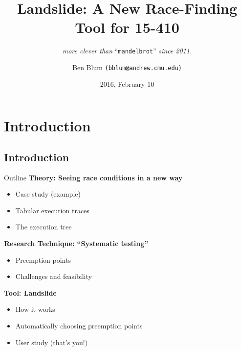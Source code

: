 \documentclass[xcolor=dvipsnames]{beamer}
\title[Landslide]{{\bf Landslide: A New Race-Finding Tool for 15-410}}
\subtitle[]{ {\em more clever than } ``\texttt{mandelbrot}'' {\em since 2011.}}
\author[Ben Blum]{Ben Blum \texttt{(bblum@andrew.cmu.edu)}}
\institute[CMU 15-410]{Carnegie Mellon University - 15-410}
\date[]{2016, February 10}
\begin{document}
\renewcommand{\inserttotalframenumber}{39}
\normalem
\begin{frame}
	\titlepage
\end{frame}


\newcommand\linegap{\vspace{0.2in}}
\newcommand\breakslide[1]{\begin{frame}{} \begin{center} #1 \end{center} \end{frame}}

\section{Introduction}
\subsection{Introduction}

\begin{frame}{Outline}
	\textbf{Theory: Seeing race conditions in a new way}
	\begin{itemize}
		\item Case study (example)
		\item Tabular execution traces
		\item The execution tree
	\end{itemize}
	{\bf Research Technique: ``Systematic testing''}
	\begin{itemize}
		\item Preemption points
		\item Challenges and feasibility
	\end{itemize}
	{\bf Tool: Landslide}
	\begin{itemize}
		\item How it works
		\item Automatically choosing preemption points
		\item User study (that's you!)
	\end{itemize}
\end{frame}
\end{document}
